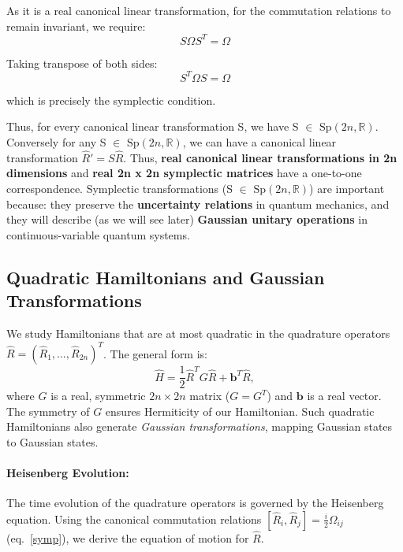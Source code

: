 As it is a real canonical linear transformation, for the commutation relations to remain invariant, we require:
\begin{equation*}
S \Omega S^T = \Omega
\end{equation*}

Taking transpose of both sides:
\begin{equation}
S^T \Omega S = \Omega
\end{equation}

which is precisely the symplectic condition.

Thus, for every canonical linear transformation S, we have S $\in$ $\mathrm{Sp}(2n,\mathbb{R})$. Conversely for any S $\in$ $\mathrm{Sp}(2n,\mathbb{R})$, we can have a canonical linear transformation $\hat{R}' = S \hat{R}$. Thus, \textbf{real canonical linear transformations in 2n dimensions} and \textbf{real 2n x 2n symplectic matrices} have a one-to-one correspondence. Symplectic transformations (S $\in$ $\mathrm{Sp}(2n,\mathbb{R})$) are important because: they preserve the \textbf{uncertainty relations} in quantum mechanics, and they will describe (as we will see later) \textbf{Gaussian unitary operations} in continuous-variable quantum systems.

\vspace{0.5em}




\subsection{Quadratic Hamiltonians and Gaussian Transformations}

We study Hamiltonians that are at most quadratic in the quadrature operators $\hat{R} = (\hat{R}_1, \dots, \hat{R}_{2n})^T$. The general form is:
\begin{equation}
\hat{H} = \frac{1}{2} \hat{R}^T G \hat{R} + \mathbf{b}^T \hat{R},
\label{eq:quad_ham}
\end{equation}
where $G$ is a real, symmetric $2n \times 2n$ matrix ($G=G^T$) and $\mathbf{b}$ is a real vector. The symmetry of $G$ ensures Hermiticity of our Hamiltonian. Such quadratic Hamiltonians also generate \textit{Gaussian transformations}, mapping Gaussian states to Gaussian states.

\paragraph{Heisenberg Evolution:}

The time evolution of the quadrature operators is governed by the Heisenberg equation. Using the canonical commutation relations $[\hat{R}_i, \hat{R}_j] = \frac{i}{2} \Omega_{ij}$ (eq.~\eqref{symp}), we derive the equation of motion for $\hat{R}$.


